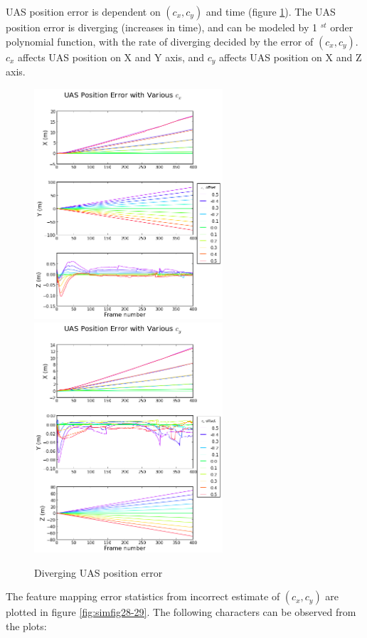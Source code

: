 UAS position error is dependent on $(c_{x}, c_{y})$ and time (figure
\ref{fig:simfig36-37}). The UAS position error is diverging (increases
in time), and can be modeled by 1 $^{st}$ order polynomial function,
with the rate of diverging decided by the error of $(c_{x}, c_{y})$.
$c_{x}$ affects UAS position on X and Y axis, and $c_{y}$ affects UAS
position on X and Z axis.

\begin{figure}[h]
  \centering
  \includegraphics[width=7cm,keepaspectratio=true]{./Figures/SimulationFigures/Figure36.png}
  \includegraphics[width=7cm,keepaspectratio=true]{./Figures/SimulationFigures/Figure37.png}
  \caption{Diverging UAS position error}
  \label{fig:simfig36-37}
\end{figure}

The feature mapping error statistics from incorrect estimate of $
(c_{x}, c_{y})$ are plotted in figure \ref{fig:simfig28-29}. The
following characters can be observed from the plots:

